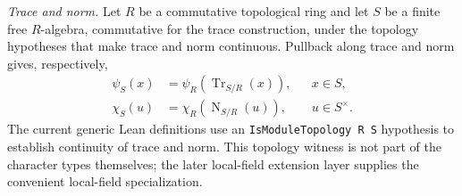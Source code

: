 \begin{definition}
\smallskip\noindent\emph{Trace and norm.}
Let \(R\) be a commutative topological ring and let \(S\) be a finite free
\(R\)-algebra, commutative for the trace construction, under the topology
hypotheses that make trace and norm continuous.  Pullback along trace and
norm gives, respectively,
\[
 \begin{aligned}
  \psi_S(x)
   &=\psi_R\!\left(\operatorname{Tr}_{S/R}(x)\right),
   &&x\in S,\\
  \chi_S(u)
   &=\chi_R\!\left(\operatorname{N}_{S/R}(u)\right),
   &&u\in S^\times.
 \end{aligned}
\]
The current generic Lean definitions use an
\texttt{IsModuleTopology R S} hypothesis to establish continuity of
trace and norm.  This topology witness is not part of the character types
themselves; the later local-field extension layer supplies the convenient
local-field specialization.
\leanok
{}
\FormalizationContract
\end{definition}
